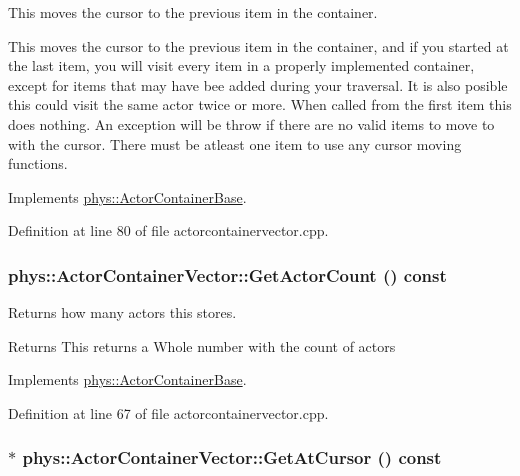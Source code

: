 This moves the cursor to the previous item in the container. 

This moves the cursor to the previous item in the container, and if you started at the last item, you will visit every item in a properly implemented container, except for items that may have bee added during your traversal. It is also posible this could visit the same actor twice or more. When called from the first item this does nothing. An exception will be throw if there are no valid items to move to with the cursor. There must be atleast one item to use any cursor moving functions. 

Implements \hyperlink{classphys_1_1ActorContainerBase_a7c424168c0bbd973b283a083714123b3}{phys::ActorContainerBase}.



Definition at line 80 of file actorcontainervector.cpp.

\hypertarget{classphys_1_1ActorContainerVector_a6d2e5e68e23f5798ad10ba41e479d0f7}{
\subsubsection[{GetActorCount}]{ phys::ActorContainerVector::GetActorCount () const}}
\label{d3/d64/classphys_1_1ActorContainerVector_a6d2e5e68e23f5798ad10ba41e479d0f7}


Returns how many actors this stores. 

\begin{DoxyReturn}{Returns}
This returns a Whole number with the count of actors 
\end{DoxyReturn}


Implements \hyperlink{classphys_1_1ActorContainerBase_aa5ec651d4634b2d90efe2a76f9d2fbdd}{phys::ActorContainerBase}.



Definition at line 67 of file actorcontainervector.cpp.

\hypertarget{classphys_1_1ActorContainerVector_a280700490b368a963dd8feae044c7a6d}{
\subsubsection[{GetAtCursor}]{ $\ast$ phys::ActorContainerVector::GetAtCursor () const}}
\label{d3/d64/classphys_1_1ActorContainerVector_a280700490b368a963dd8feae044c7a6d}


